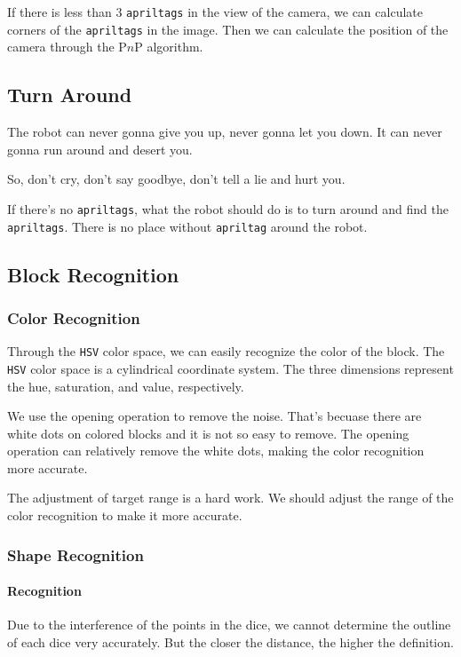 \documentclass{article}
\begin{document}
If there is less than $3$ \texttt{apriltags} in the view of the camera, we can calculate corners of the \texttt{apriltags} in the image. Then we can calculate the position of the camera through the P$n$P algorithm.

\subsection{Turn Around}
The robot can never gonna give you up, never gonna let you down. It can never gonna run around and desert you.

So, don't cry, don't say goodbye, don't tell a lie and hurt you.

If there's no \texttt{apriltags}, what the robot should do is to turn around and find the \texttt{apriltags}. There is no place without \texttt{apriltag} around the robot.

\subsection{Block Recognition}

\subsubsection{Color Recognition}
Through the \texttt{HSV} color space, we can easily recognize the color of the block. The \texttt{HSV} color space is a cylindrical coordinate system. The three dimensions represent the hue, saturation, and value, respectively.

We use the opening operation to remove the noise. That's becuase there are white dots on colored blocks and it is not so easy to remove. The opening operation can relatively remove the white dots, making the color recognition more accurate.

The adjustment of target range is a hard work. We should adjust the range of the color recognition to make it more accurate.

\subsubsection{Shape Recognition}

\paragraph{Recognition}

Due to the interference of the points in the dice, we cannot determine the outline of each dice very accurately. But the closer the distance, the higher the definition.
\end{document}
